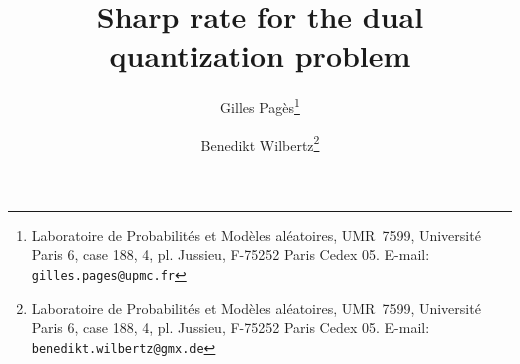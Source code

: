 \title{Sharp rate for the dual quantization problem}


\author{Gilles Pag\`es\thanks{Laboratoire de Probabilit\'es et Mod\`eles al\'eatoires, UMR~7599, Universit\'e Paris 6, case 188, 4,
pl. Jussieu, F-75252 Paris Cedex 05. E-mail: {\tt  gilles.pages@upmc.fr}}
 \and Benedikt Wilbertz\thanks{Laboratoire de Probabilit\'es et Mod\`eles al\'eatoires, UMR~7599, Universit\'e Paris 6, case 188, 4,
pl. Jussieu, F-75252 Paris Cedex 05. E-mail: {\tt  benedikt.wilbertz@gmx.de}}
 }


